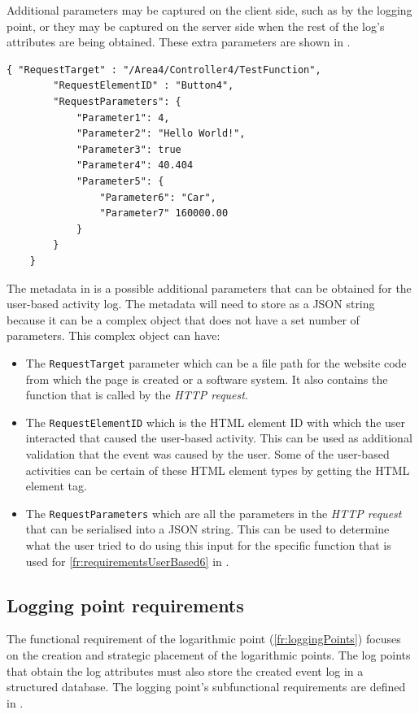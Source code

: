\clearpage

Additional parameters may be captured on the client side, such as by the logging point, or they may be captured on the server side when the rest of the log's attributes are being obtained. These extra parameters are shown in .

\begin{lstlisting}[style=json, caption={\textit{Metadata JSON}}, label={fig:ch2_MetadataJsonExample}] 
	{ "RequestTarget" : "/Area4/Controller4/TestFunction",
		"RequestElementID" : "Button4",
		"RequestParameters": {
			"Parameter1": 4,
			"Parameter2": "Hello World!",
			"Parameter3": true
			"Parameter4": 40.404
			"Parameter5": {
				"Parameter6": "Car",
				"Parameter7" 160000.00
			}
		}		
	}
\end{lstlisting}

The metadata in  is a possible additional parameters that can be obtained for the user-based activity log. The metadata will need to store as a JSON string because it can be a complex object that does not have a set number of parameters. This complex object can have:

\begin{itemize}
	\item The \texttt{RequestTarget} parameter which can be a file path for the website code from which the page is created or a software system. It also contains the function that is called by the \textit{HTTP request}.
	\item The \texttt{RequestElementID} which is the HTML element ID with which the user interacted that caused the user-based activity. This can be used as additional validation that the event was caused by the user. Some of the user-based activities can be certain of these HTML element types by getting the HTML element tag.
	\item The \texttt{RequestParameters} which are all the parameters in the \textit{HTTP request} that can be serialised into a JSON string. This can be used to determine what the user tried to do using this input for the specific function that is used for \ref{fr:requirementsUserBased6} in .
\end{itemize}

\clearpage

\subsection{Logging point requirements}\label{sec:ch2_serverFunctionalRequirements}
The functional requirement of the logarithmic point (\ref{fr:loggingPoints}) focuses on the creation and strategic placement of the logarithmic points. The log points that obtain the log attributes must also store the created event log in a structured database. The logging point's subfunctional requirements are defined in . 

